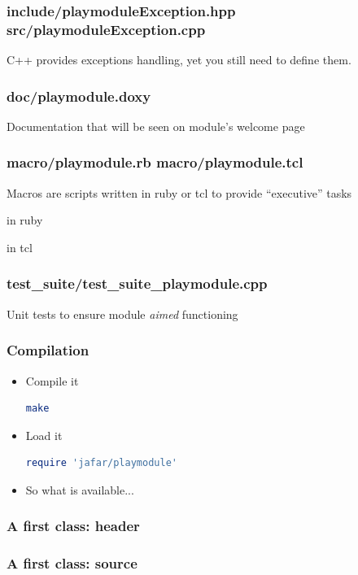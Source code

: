 \documentclass[pdf]{beamer}
\begin{document}
\begin{frame}
  \frametitle{include/playmoduleException.hpp src/playmoduleException.cpp}
  C++ provides exceptions handling, yet you still need to define them.
  
\end{frame}
\begin{frame}
  \frametitle{doc/playmodule.doxy}
  Documentation that will be seen on module's welcome page
  
\end{frame}
\begin{frame}
  \frametitle{macro/playmodule.rb macro/playmodule.tcl}
  Macros are scripts written in ruby or tcl to provide ``executive'' tasks
  \begin{block}{in ruby}
    
  \end{block}
  \pause
  \begin{block}{in tcl}
    
  \end{block}
\end{frame}

\begin{frame}
  \frametitle{test\_suite/test\_suite\_playmodule.cpp}
  Unit tests to ensure module \textit{aimed} functioning
  
\end{frame}
\begin{frame}[fragile]
  \frametitle{Compilation}
  \begin{itemize}
    \item<1-> Compile it
      \begin{lstlisting}[language=bash]
make
      \end{lstlisting}
    \item<2-> Load it
      \begin{lstlisting}[language=ruby]
require 'jafar/playmodule'
      \end{lstlisting}
    \item<3-> So what is available...
  \end{itemize}
\end{frame}

\begin{frame}
  \frametitle{A first class: header}
  
\end{frame}

\begin{frame}
  \frametitle{A first class: source}
  
\end{frame}
\end{document}
